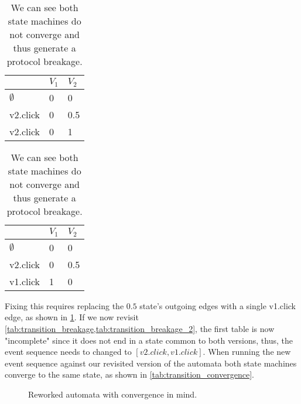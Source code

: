 \documentclass[a4paper]{article}
\begin{document}
\begin{table}[ht]
    \centering
    \begin{tabular}{l|l|l|}
        \cline{2-3}
                                          & $V_1$ & $V_2$ \\ \hline
        \multicolumn{1}{|l|}{$\emptyset$} & 0     & 0     \\ \hline
        \multicolumn{1}{|l|}{v2.click}    & 0     & 0.5   \\ \hline
        \multicolumn{1}{|l|}{v2.click}    & 0     & 1     \\ \hline
    \end{tabular}
    \caption{We can see both state machines do not converge and thus generate a protocol breakage.}
    \label{tab:transition_breakage}
\end{table}

\begin{table}[ht]
    \centering
    \begin{tabular}{l|l|l|}
        \cline{2-3}
                                          & $V_1$ & $V_2$ \\ \hline
        \multicolumn{1}{|l|}{$\emptyset$} & 0     & 0     \\ \hline
        \multicolumn{1}{|l|}{v2.click}    & 0     & 0.5   \\ \hline
        \multicolumn{1}{|l|}{v1.click}    & 1     & 0     \\ \hline
    \end{tabular}
    \caption{We can see both state machines do not converge and thus generate a protocol breakage.}
    \label{tab:transition_breakage_2}
\end{table}

Fixing this requires replacing the $0.5$ state's outgoing edges with a single v1.click edge,
as shown in \cref{fig:bulb_fsm_converge}.
If we now revisit \cref{tab:transition_breakage,tab:transition_breakage_2},
the first table is now "incomplete" since it does not end in a state common to both versions,
thus, the event sequence needs to changed to $[v2.click, v1.click]$.
When running the new event sequence against our revisited version of the automata both
state machines converge to the same state, as shown in \cref{tab:transition_convergence}.

\begin{figure}[ht]
    \centering
    \caption{Reworked automata with convergence in mind.}
    \label{fig:bulb_fsm_converge}
\end{figure}
\end{document}

